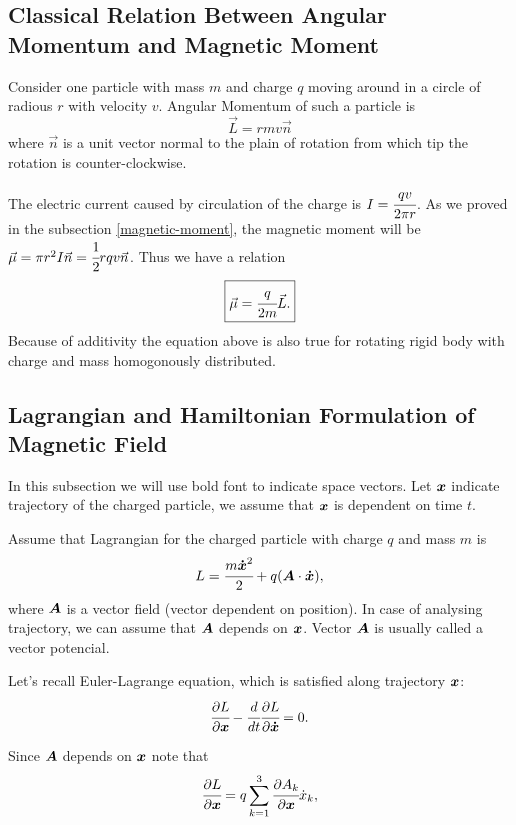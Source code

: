 \documentclass[main.tex]{subfiles}
\begin{document}
\subsection{Classical Relation Between Angular Momentum and Magnetic Moment}
Consider one particle with mass $m$ and charge $q$ moving around in a circle of radious $r$ with velocity $v$. Angular Momentum of such a particle is
\begin{equation}
\vec{L} = rmv\vec{n}
\end{equation}
where $\vec{n}$ is a unit vector normal to the plain of rotation from which tip the rotation is counter-clockwise.

The electric current caused by circulation of the charge is $I = \cfrac{qv}{2\pi r}$. As we proved in the subsection \ref{magnetic-moment}, the magnetic moment will be $\vec{\mu} = \pi r^2 I \vec{n} = \cfrac{1}{2} rqv\vec{n}$.
Thus we have a relation
\begin{equation}
\boxed{
\vec{\mu} = \cfrac{q}{2m}\vec{L}.
}
\end{equation} 
Because of additivity the equation above is also true for rotating rigid body with charge and mass homogonously distributed.

\subsection{Lagrangian and Hamiltonian Formulation of Magnetic Field}

In this subsection we will use bold font to indicate space vectors.
Let $\boldsymbol{x}$ indicate trajectory of the charged particle, we assume that $\boldsymbol{x}$ is dependent on time $t$.

Assume that Lagrangian for the charged particle with charge $q$ and mass $m$ is
\begin{equation}
L = \cfrac{m\boldsymbol{\dot{x}}^2}{2} + q(\boldsymbol{A}\cdot\boldsymbol{\dot{x}}),
\end{equation}
where $\boldsymbol{A}$ is a vector field (vector dependent on position). In case of analysing trajectory, we can assume that $\boldsymbol{A}$ depends on $\boldsymbol{x}$. Vector $\boldsymbol{A}$ is usually called a vector potencial. 

Let's recall Euler-Lagrange equation, which is satisfied along trajectory $\boldsymbol{x}$:
\begin{equation}
\cfrac{\partial L}{\partial \boldsymbol{x}} - \cfrac{d}{dt}\cfrac{\partial L}{\partial \boldsymbol{\dot{x}}} = 0.
\end{equation} 

Since $\boldsymbol{A}$ depends on $\boldsymbol{x}$ note that
\begin{equation}
\cfrac{\partial L}{\partial \boldsymbol{x}} = q\sum_{k=1}^3 \cfrac{\partial A_k}{\partial \boldsymbol{x}} \dot{x}_k,
\end{equation}
\end{document}
